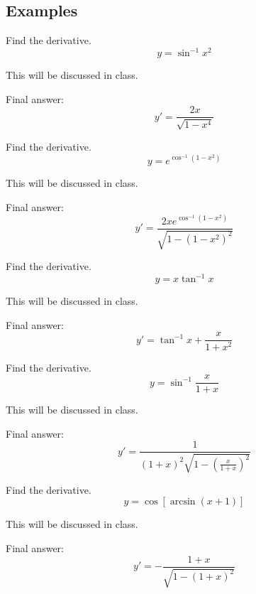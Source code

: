 \documentclass[12pt,addpoints, answers, fleqn]{exam}
\begin{document}
 
 
\subsection{Examples}

\begin{questions}

\question Find the derivative.
\[
y = \sin^{-1} x^2
\]
\begin{solution}
This will be discussed in class.

Final answer:
\[
y' =  \frac{2x}{\sqrt{1-x^4}}
\]
\end{solution}


\question Find the derivative.
\[
 y = e^{\cos^{-1} \left(1-x^2\right)}
 \]
\begin{solution}
This will be discussed in class.

Final answer:
\[
y'  =  \frac{2xe^{\cos^{-1} \left(1-x^2\right)}}{\sqrt{1-\left(1-x^2\right)^2}} 
\]
\end{solution}


\question Find the derivative.
\[
 y = x\tan^{-1} x
 \]
\begin{solution}
This will be discussed in class.

Final answer:
\[
 y' = \tan^{-1} x + \frac{x}{1+x^2}
 \]
\end{solution}


\question Find the derivative.
\[
 y = \sin^{-1} \frac{x}{1+x}
\]
\begin{solution}
This will be discussed in class.

Final answer:
\[
y' =  \frac{1}{\left(1+x\right)^2\sqrt{1-\left(\frac{x}{1+x}\right)^2}}
\]
\end{solution}


\question Find the derivative.
\[
y = \cos \left[ \arcsin \left( x + 1 \right) \right]
\]
\begin{solution}
This will be discussed in class.

Final answer:
\[
y' = -\frac{1+x}{\sqrt{1-(1+x)^2}}
\]
\end{solution}



\end{questions}
\end{document}
